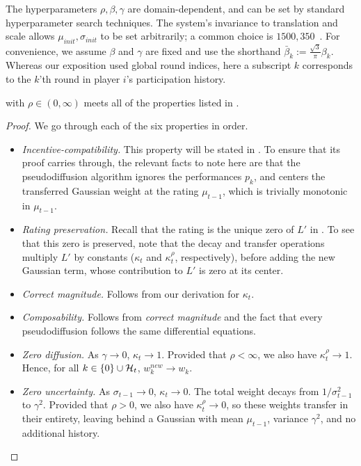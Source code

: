 The hyperparameters $\rho,\beta,\gamma$ are domain-dependent, and can be set by standard hyperparameter search techniques. The system's invariance to translation and scale allows $\mu_{init},\sigma_{init}$ to be set arbitrarily; a common choice is $1500,350$~\cite{G12}. For convenience, we assume $\beta$ and $\gamma$ are fixed and use the shorthand $\bar\beta_k := \frac{\sqrt{3}}{\pi} \beta_k$. Whereas our exposition used global round indices, here a subscript $k$ corresponds to the $k$'th round in player $i$'s participation history.

\begin{theorem}
\label{thm:diffuse-prop}
 with $\rho\in(0,\infty)$ meets all of the properties listed in .
\end{theorem}

\begin{proof}
We go through each of the six properties in order.
\begin{itemize}[leftmargin=*]
    \item \emph{Incentive-compatibility.} This property will be stated in . To ensure that its proof carries through, the relevant facts to note here are that the pseudodiffusion algorithm ignores the performances $p_k$, and centers the transferred Gaussian weight at the rating $\mu_{t-1}$, which is trivially monotonic in $\mu_{t-1}$.
    \item \emph{Rating preservation.} Recall that the rating is the unique zero of $L'$ in . To see that this zero is preserved, note that the decay and transfer operations multiply $L'$ by constants ($\kappa_t$ and $\kappa_t^\rho$, respectively), before adding the new Gaussian term, whose contribution to $L'$ is zero at its center.
    \item \emph{Correct magnitude.} Follows from our derivation for $\kappa_t$.
    \item \emph{Composability.} Follows from \emph{correct magnitude} and the fact that every pseudodiffusion follows the same differential equations.
    \item \emph{Zero diffusion.} As $\gamma\rightarrow 0$, $\kappa_t\rightarrow 1$. Provided that $\rho<\infty$, we also have $\kappa_t^\rho\rightarrow 1$. Hence, for all $k\in\{0\}\cup{\mathcal{H}}_t$, $w_k^{new} \rightarrow w_k$.
    \item \emph{Zero uncertainty.} As $\sigma_{t-1}\rightarrow 0$, $\kappa_t\rightarrow 0$. The total weight decays from $1/\sigma_{t-1}^2$ to $\gamma^2$. Provided that $\rho > 0$, we also have $\kappa_t^\rho\rightarrow 0$, so these weights transfer in their entirety, leaving behind a Gaussian with mean $\mu_{t-1}$, variance $\gamma^2$, and no additional history. \qedhere
\end{itemize}
\end{proof}

